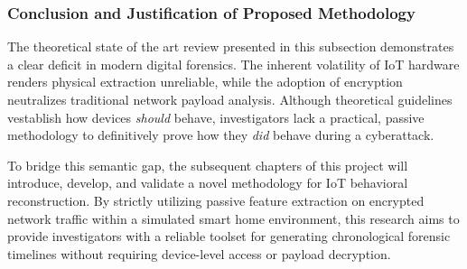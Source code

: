 \subsubsection{Conclusion and Justification of Proposed Methodology}
The theoretical state of the art review presented in this subsection demonstrates a clear deficit in modern digital forensics. The inherent volatility of IoT hardware renders physical extraction unreliable, while the adoption of encryption neutralizes traditional network payload analysis. Although theoretical guidelines vestablish how devices \textit{should} behave, investigators lack a practical, passive methodology to definitively prove how they \textit{did} behave during a cyberattack.

To bridge this semantic gap, the subsequent chapters of this project will introduce, develop, and validate a novel methodology for IoT behavioral reconstruction. By strictly utilizing passive feature extraction on encrypted network traffic within a simulated smart home environment, this research aims to provide investigators with a reliable toolset for generating chronological forensic timelines without requiring device-level access or payload decryption.

